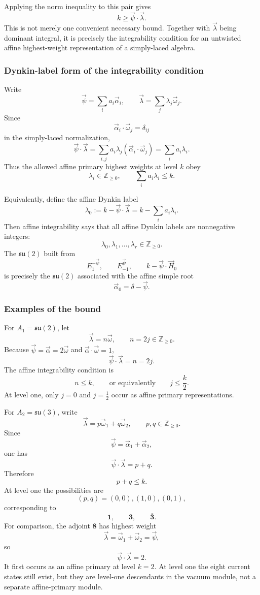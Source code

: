 \documentclass[
  10pt,
  a4paper,
  openany]{book}
\begin{document}
Applying the norm inequality to this pair gives \[
k\geq\vec\psi\cdot\vec\lambda.
\] This is not merely one convenient necessary bound. Together with
\(\vec\lambda\) being dominant integral, it is precisely the
integrability condition for an untwisted affine highest-weight
representation of a simply-laced algebra.

\subsubsection{Dynkin-label form of the integrability
condition}\label{dynkin-label-form-of-the-integrability-condition}

Write \[
\vec\psi=\sum_i a_i\vec\alpha_i,
\qquad
\vec\lambda=\sum_j\lambda_j\vec\omega_j.
\] Since \[
\vec\alpha_i\cdot\vec\omega_j=\delta_{ij}
\] in the simply-laced normalization, \[
\vec\psi\cdot\vec\lambda
=\sum_{i,j}a_i\lambda_j
(\vec\alpha_i\cdot\vec\omega_j)
=\sum_i a_i\lambda_i.
\] Thus the allowed affine primary highest weights at level \(k\) obey
\[
\boxed{
\lambda_i\in\mathbb Z_{\geq0},
\qquad
\sum_i a_i\lambda_i\leq k.
}
\]

Equivalently, define the affine Dynkin label \[
\lambda_0
:=k-\vec\psi\cdot\vec\lambda
=k-\sum_i a_i\lambda_i.
\] Then affine integrability says that all affine Dynkin labels are
nonnegative integers: \[
\lambda_0,\lambda_1,\ldots,\lambda_r
\in\mathbb Z_{\geq0}.
\] The \(\mathfrak{su}(2)\) built from \[
E_1^{-\vec\psi},
\qquad
E_{-1}^{\vec\psi},
\qquad
k-\vec\psi\cdot\vec H_0
\] is precisely the \(\mathfrak{su}(2)\) associated with the affine
simple root \[
\vec\alpha_0=\delta-\vec\psi.
\]

\subsubsection{Examples of the bound}\label{examples-of-the-bound}

For \(A_1=\mathfrak{su}(2)\), let \[
\vec\lambda=n\vec\omega,
\qquad
n=2j\in\mathbb Z_{\geq0}.
\] Because \(\vec\psi=\vec\alpha=2\vec\omega\) and
\(\vec\alpha\cdot\vec\omega=1\), \[
\vec\psi\cdot\vec\lambda=n=2j.
\] The affine integrability condition is \[
n\leq k,
\qquad\text{or equivalently}\qquad
j\leq\frac{k}{2}.
\] At level one, only \(j=0\) and \(j=\frac12\) occur as affine primary
representations.

For \(A_2=\mathfrak{su}(3)\), write \[
\vec\lambda=p\vec\omega_1+q\vec\omega_2,
\qquad
p,q\in\mathbb Z_{\geq0}.
\] Since \[
\vec\psi=\vec\alpha_1+\vec\alpha_2,
\] one has \[
\vec\psi\cdot\vec\lambda=p+q.
\] Therefore \[
p+q\leq k.
\] At level one the possibilities are \[
(p,q)=(0,0),(1,0),(0,1),
\] corresponding to \[
\mathbf 1,
\qquad
\mathbf 3,
\qquad
\overline{\mathbf 3}.
\] For comparison, the adjoint \(\mathbf 8\) has highest weight \[
\vec\lambda=\vec\omega_1+\vec\omega_2=\vec\psi,
\] so \[
\vec\psi\cdot\vec\lambda=2.
\] It first occurs as an affine primary at level \(k=2\). At level one
the eight current states still exist, but they are level-one descendants
in the vacuum module, not a separate affine-primary module.
\end{document}
